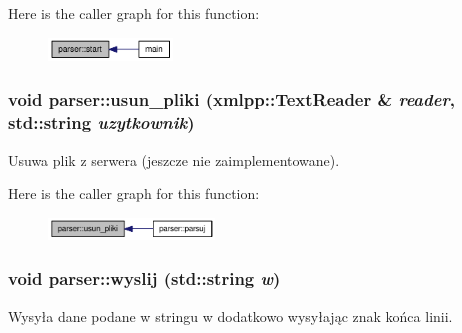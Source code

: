 Here is the caller graph for this function:\nopagebreak
\begin{figure}[H]
\begin{center}
\leavevmode
\includegraphics[width=94pt]{dd/dad/a00005_7793913f528921aa22c4b6cc259a0a14_icgraph}
\end{center}
\end{figure}
\hypertarget{a00005_7ef79f818429f70b9cb35c0a33b59a10}{
\subsubsection[{usun\_\-pliki}]{\setlength{\rightskip}{0pt plus 5cm}void parser::usun\_\-pliki (xmlpp::TextReader \& {\em reader}, \/  std::string {\em uzytkownik})}}
\label{dd/dad/a00005_7ef79f818429f70b9cb35c0a33b59a10}


Usuwa plik z serwera (jeszcze nie zaimplementowane). 



Here is the caller graph for this function:\nopagebreak
\begin{figure}[H]
\begin{center}
\leavevmode
\includegraphics[width=125pt]{dd/dad/a00005_7ef79f818429f70b9cb35c0a33b59a10_icgraph}
\end{center}
\end{figure}
\hypertarget{a00005_2f6aceaa94a28fc699e4f824f7622b51}{
\subsubsection[{wyslij}]{\setlength{\rightskip}{0pt plus 5cm}void parser::wyslij (std::string {\em w})}}
\label{dd/dad/a00005_2f6aceaa94a28fc699e4f824f7622b51}


Wysyła dane podane w stringu w dodatkowo wysyłając znak końca linii. 



